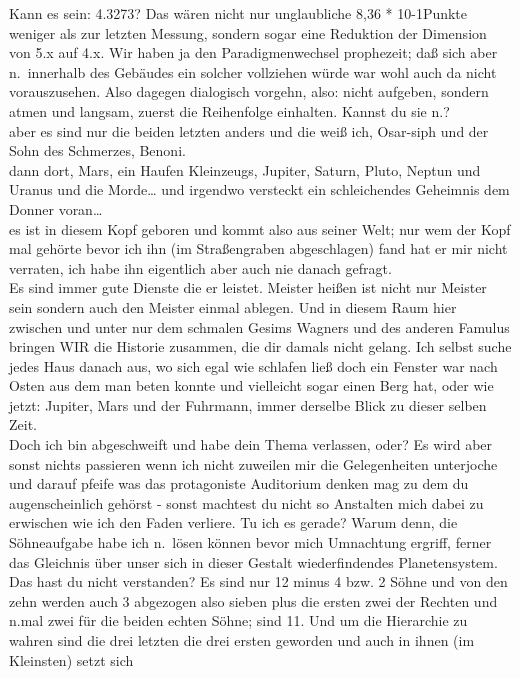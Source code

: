 \documentclass[
]{article}
\begin{document}
\begin{enumerate}
  Kann es sein: 4.3273? Das wären nicht nur unglaubliche 8,36 *
  10-1Punkte weniger als zur letzten Messung, sondern sogar eine
  Reduktion der Dimension von 5.x auf 4.x. Wir haben ja den
  Paradigmenwechsel prophezeit; daß sich aber n.~innerhalb des Gebäudes
  ein solcher vollziehen würde war wohl auch da nicht vorauszusehen.
  Also dagegen dialogisch vorgehn, also: nicht aufgeben, sondern atmen
  und langsam, zuerst die Reihenfolge einhalten. Kannst du sie n.?\\
  aber es sind nur die beiden letzten anders und die weiß ich, Osar-siph
  und der Sohn des Schmerzes, Benoni.\\
  dann dort, Mars, ein Haufen Kleinzeugs, Jupiter, Saturn, Pluto, Neptun
  und Uranus und die Morde\ldots{} und irgendwo versteckt ein
  schleichendes Geheimnis dem Donner voran\ldots{}\\
  es ist in diesem Kopf geboren und kommt also aus seiner Welt; nur wem
  der Kopf mal gehörte bevor ich ihn (im Straßengraben abgeschlagen)
  fand hat er mir nicht verraten, ich habe ihn eigentlich aber auch nie
  danach gefragt.\\
  Es sind immer gute Dienste die er leistet. Meister heißen ist nicht
  nur Meister sein sondern auch den Meister einmal ablegen. Und in
  diesem Raum hier zwischen und unter nur dem schmalen Gesims Wagners
  und des anderen Famulus bringen WIR die Historie zusammen, die dir
  damals nicht gelang. Ich selbst suche jedes Haus danach aus, wo sich
  egal wie schlafen ließ doch ein Fenster war nach Osten aus dem man
  beten konnte und vielleicht sogar einen Berg hat, oder wie jetzt:
  Jupiter, Mars und der Fuhrmann, immer derselbe Blick zu dieser selben
  Zeit.\\
  Doch ich bin abgeschweift und habe dein Thema verlassen, oder? Es wird
  aber sonst nichts passieren wenn ich nicht zuweilen mir die
  Gelegenheiten unterjoche und darauf pfeife was das protagoniste
  Auditorium denken mag zu dem du augenscheinlich gehörst - sonst
  machtest du nicht so Anstalten mich dabei zu erwischen wie ich den
  Faden verliere. Tu ich es gerade? Warum denn, die Söhneaufgabe habe
  ich n.~lösen können bevor mich Umnachtung ergriff, ferner das
  Gleichnis über unser sich in dieser Gestalt wiederfindendes
  Planetensystem. Das hast du nicht verstanden? Es sind nur 12 minus 4
  bzw. 2 Söhne und von den zehn werden auch 3 abgezogen also sieben plus
  die ersten zwei der Rechten und n.mal zwei für die beiden echten
  Söhne; sind 11. Und um die Hierarchie zu wahren sind die drei letzten
  die drei ersten geworden und auch in ihnen (im Kleinsten) setzt sich

\end{enumerate}
\end{document}
